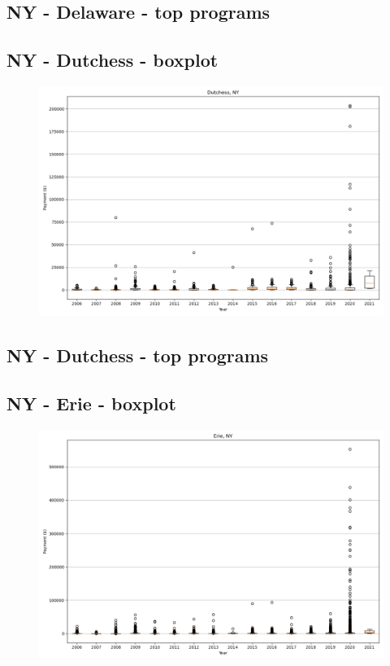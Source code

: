 \subsection*{NY - Delaware - top programs}

\newpage
\subsection*{NY - Dutchess - boxplot}
\begin{figure}[h]
\centering
\includegraphics[width=7in]{../output/boxplots/counties/Dutchess-NY_boxplot.png}
\end{figure}


\subsection*{NY - Dutchess - top programs}

\newpage
\subsection*{NY - Erie - boxplot}
\begin{figure}[h]
\centering
\includegraphics[width=7in]{../output/boxplots/counties/Erie-NY_boxplot.png}
\end{figure}


